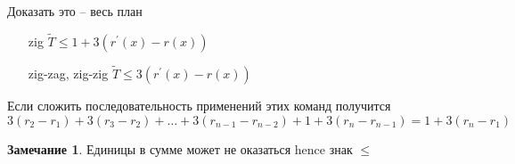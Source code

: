 \documentclass{book}
\newcommand{\p}[1]{#1^{\prime}}
\theoremstyle{definition}
\newtheorem*{note}{Замечание}
\newcommand{\tl}[1]{\widetilde{#1}}
\begin{document}
Доказать это -- весь план

\begin{itemize}
    \item [zig] $\tl T \leqslant  1 + 3\left( \p r(x) - r(x) \right) $
    \item [zig-zag, zig-zig]  $\tl T \leqslant 3\left( \p r(x) - r(x) \right) $
\end{itemize}

Если сложить последовательность применений этих команд получится $3(r_2-r_1) + 3\left( r_3-r_2 \right)  + \ldots + 3\left( r_{n-1} - r_{n-2} \right) +1 + 3\left( r_n - r_{n-1} \right)  = 1 + 3\left( r_n-r_1 \right) $

\begin{note}
    Единицы в сумме может не оказаться hence знак $\leqslant $
\end{note}
\end{document}
